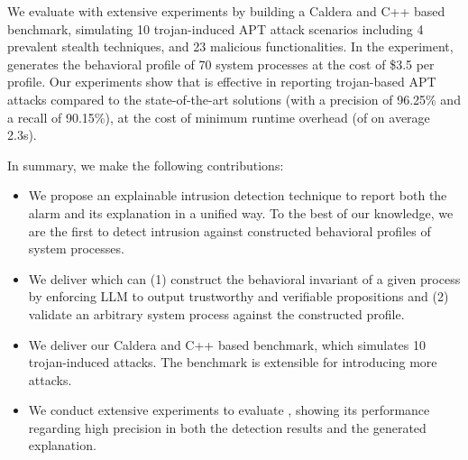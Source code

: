 We evaluate \tool with extensive experiments by building a Caldera\cite{caldera} and C++ based benchmark,
simulating 10 trojan-induced APT attack scenarios including 
4 prevalent stealth techniques, 
and 23 malicious functionalities.
In the experiment, \tool generates the behavioral profile of 70 system processes
at the cost of \$3.5 per profile.
Our experiments show that 
\tool is effective in reporting trojan-based APT attacks compared to the state-of-the-art solutions (with a precision of 96.25\% and a recall of 90.15\%),
at the cost of minimum runtime overhead (of on average 2.3s).

In summary, we make the following contributions:
\begin{itemize}[leftmargin=*]
  \item We propose an explainable intrusion detection technique \tool to report both the alarm and its explanation in a unified way. 
      To the best of our knowledge, we are the first to detect intrusion against constructed behavioral profiles of system processes.
  \item We deliver \tool which can 
    (1) construct the behavioral invariant of a given process by enforcing LLM to output trustworthy and verifiable propositions and
    (2) validate an arbitrary system process against the constructed profile.
  \item We deliver our Caldera and C++ based benchmark, which simulates 10 trojan-induced attacks. 
    The benchmark is extensible for introducing more attacks.
  \item We conduct extensive experiments to evaluate \tool, showing its performance regarding high precision in both the detection results and the generated explanation.
\end{itemize}
 
